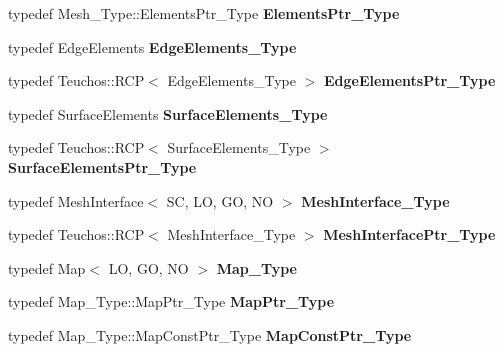 \begin{DoxyCompactItemize}
typedef Mesh\+\_\+\+Type\+::\+Elements\+Ptr\+\_\+\+Type {\bfseries Elements\+Ptr\+\_\+\+Type}
\item 
\mbox{\label{classFEDD_1_1ErrorEstimation_a4ecf8fe210fc6060b24b37d1955d9a41}} 
typedef Edge\+Elements {\bfseries Edge\+Elements\+\_\+\+Type}
\item 
\mbox{\label{classFEDD_1_1ErrorEstimation_a8d86e0d3a5fbf66548b2919590a80342}} 
typedef Teuchos\+::\+R\+CP$<$ Edge\+Elements\+\_\+\+Type $>$ {\bfseries Edge\+Elements\+Ptr\+\_\+\+Type}
\item 
\mbox{\label{classFEDD_1_1ErrorEstimation_a240b95cf08c5e92bbe1a03555dc6f519}} 
typedef Surface\+Elements {\bfseries Surface\+Elements\+\_\+\+Type}
\item 
\mbox{\label{classFEDD_1_1ErrorEstimation_a0f79f50fb173e3acc3167279a7f1345a}} 
typedef Teuchos\+::\+R\+CP$<$ Surface\+Elements\+\_\+\+Type $>$ {\bfseries Surface\+Elements\+Ptr\+\_\+\+Type}
\item 
\mbox{\label{classFEDD_1_1ErrorEstimation_a00302cf977be058f72385dd6687344cb}} 
typedef Mesh\+Interface$<$ SC, LO, GO, NO $>$ {\bfseries Mesh\+Interface\+\_\+\+Type}
\item 
\mbox{\label{classFEDD_1_1ErrorEstimation_ab247d74ce40f3b9ca72334ed61052cf6}} 
typedef Teuchos\+::\+R\+CP$<$ Mesh\+Interface\+\_\+\+Type $>$ {\bfseries Mesh\+Interface\+Ptr\+\_\+\+Type}
\item 
\mbox{\label{classFEDD_1_1ErrorEstimation_a3c51bc6fe3a5ab13cd4e4fb44bff78c9}} 
typedef Map$<$ LO, GO, NO $>$ {\bfseries Map\+\_\+\+Type}
\item 
\mbox{\label{classFEDD_1_1ErrorEstimation_a56971c3f5c10a56a42c694676f52d3c1}} 
typedef Map\+\_\+\+Type\+::\+Map\+Ptr\+\_\+\+Type {\bfseries Map\+Ptr\+\_\+\+Type}
\item 
\mbox{\label{classFEDD_1_1ErrorEstimation_acc2c8e7ecacdf0992be92861366de188}} 
typedef Map\+\_\+\+Type\+::\+Map\+Const\+Ptr\+\_\+\+Type {\bfseries Map\+Const\+Ptr\+\_\+\+Type}

\end{DoxyCompactItemize}
